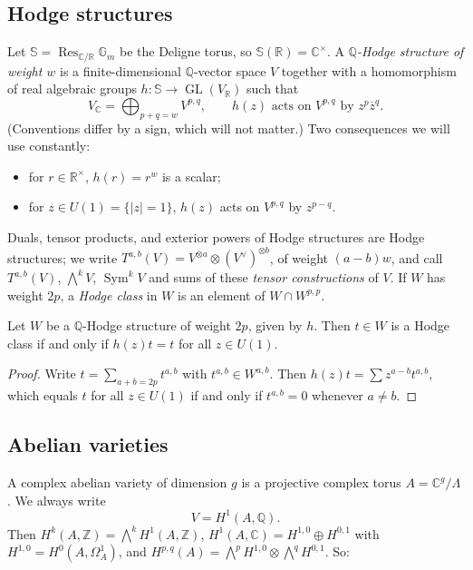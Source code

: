 \documentclass[12pt]{amsart}
\newcommand{\R}{\mathbb{R}}
\newcommand{\Q}{\mathbb{Q}}
\newcommand{\C}{\mathbb{C}}
\newcommand{\Z}{\mathbb{Z}}
\newcommand{\Gm}{\mathbb{G}_m}
\newcommand{\Del}{\mathbb{S}}
\DeclareMathOperator{\GL}{GL}
\DeclareMathOperator{\Res}{Res}
\DeclareMathOperator{\Sym}{Sym}
\newcommand{\ol}{\overline}
\let\oldbigwedge\bigwedge
\renewcommand{\bigwedge}{\mathop{\textstyle\oldbigwedge}\nolimits}
\theoremstyle{definition}
\theoremstyle{remark}
\numberwithin{equation}{section}
\begin{document}
\subsection{Hodge structures}
Let $\Del = \Res_{\C/\R} \Gm$ be the Deligne torus, so $\Del(\R) = \C^\times$.
A \emph{$\Q$-Hodge structure of weight $w$} is a finite-dimensional
$\Q$-vector space $V$ together with a homomorphism of real algebraic groups
$h \colon \Del \to \GL(V_\R)$ such that
\begin{equation*}
    V_\C = \bigoplus_{p + q = w} V^{p,q}, \qquad
    h(z) \text{ acts on } V^{p,q} \text{ by } z^p \ol{z}^q.
\end{equation*}
(Conventions differ by a sign, which will not matter.) Two consequences we will
use constantly:
\begin{itemize}
    \item for $r \in \R^\times$, $h(r) = r^w$ is a scalar;
    \item for $z \in U(1) = \{|z| = 1\}$, $h(z)$ acts on $V^{p,q}$ by
    $z^{p-q}$.
\end{itemize}
Duals, tensor products, and exterior powers of Hodge structures are Hodge
structures; we write
$T^{a,b}(V) = V^{\otimes a} \otimes (V^\vee)^{\otimes b}$, of weight
$(a-b)w$, and call $T^{a,b}(V)$, $\bigwedge^k V$, $\Sym^k V$ and sums of these
\emph{tensor constructions} of $V$. If $W$ has weight $2p$, a \emph{Hodge
class} in $W$ is an element of $W \cap W^{p,p}$.

\begin{lemma}\label{lem:U1}
    Let $W$ be a $\Q$-Hodge structure of weight $2p$, given by $h$. Then
    $t \in W$ is a Hodge class if and only if $h(z) t = t$ for all
    $z \in U(1)$.
\end{lemma}
\begin{proof}
    Write $t = \sum_{a+b = 2p} t^{a,b}$ with $t^{a,b} \in W^{a,b}$. Then
    $h(z) t = \sum z^{a-b} t^{a,b}$, which equals $t$ for all $z \in U(1)$ if
    and only if $t^{a,b} = 0$ whenever $a \neq b$.
\end{proof}

\subsection{Abelian varieties}
A complex abelian variety of dimension $g$ is a projective complex torus
$A = \C^g / \Lambda$. We always write
\begin{equation*}
    V = H^1(A, \Q).
\end{equation*}
Then $H^k(A, \Z) = \bigwedge^k H^1(A, \Z)$,
$H^1(A, \C) = H^{1,0} \oplus H^{0,1}$ with $H^{1,0} = H^0(A, \Omega^1_A)$, and
$H^{p,q}(A) = \bigwedge^p H^{1,0} \otimes \bigwedge^q H^{0,1}$. So:
\end{document}
